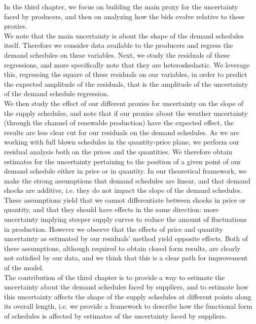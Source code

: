 In the third chapter, we focus on building the main proxy for the uncertainty faced by producers, and then on analyzing how the bids evolve relative to these proxies.\\

We note that the main uncertainty is about the shape of the demand schedules itself. Therefore we consider data available to the producers and regress the demand schedules on these variables. Next, we study the residuals of these regressions, and more specifically note that they are heteroskedastic. We leverage this, regressing the square of these residuals on our variables, in order to predict the expected amplitude of the residuals, that is the amplitude of the uncertainty of the demand schedule regression.\\

We then study the effect of our different proxies for uncertainty on the slope of the supply schedules, and note that if our proxies about the weather uncertainty (through the channel of renewable production) have the expected effect, the results are less clear cut for our residuals on the demand schedules. As we are working with full blown schedules in the quantity-price plane, we perform our residual analysis both on the prices and the quantities. We therefore obtain estimates for the uncertainty pertaining to the position of a given point of our demand schedule either in price or in quantity. In our theoretical framework, we make the strong assumptions that demand schedules are linear, and that demand shocks are additive, i.e. they do not impact the slope of the demand schedules. These assumptions yield that we cannot differentiate between shocks in price or quantity, and that they should have effects in the same direction: more uncertainty implying steeper supply curves to reduce the amount of fluctuations in production. However we observe that the effects of price and quantity uncertainty as estimated by our residuals' method yield opposite effects. Both of these assumptions, although required to obtain closed form results, are clearly not satisfied by our data, and we think that this is a clear path for improvement of the model.  \\

The contribution of the third chapter is to provide a way to estimate the uncertainty about the demand schedules faced by suppliers, and to estimate how this uncertainty affects the shape of the supply schedules at different points along its overall length, i.e. we provide a framework to describe how the functional form of schedules is affected by estimates of the uncertainty faced by suppliers.

